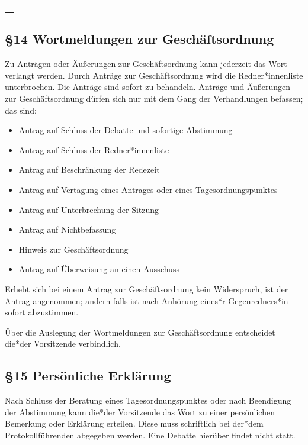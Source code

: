 \documentclass[12pt]{report}
\begin{document}
\begin{flushleft}
\begin{table}[H]
 \begin{tabular}{|l|}
  \hline
  \rowcolor[HTML]{9AFF99} 
  \rule[-1ex]{0pt}{4ex}
  \begin{minipage}[t]{\textwidth}
   \textbf{Ende\\}  
    \end{minipage}
  \\ \hline
 \end{tabular}
\end{table}

\subsection*{§14 Wortmeldungen zur Geschäftsordnung}
Zu Anträgen oder Äußerungen zur Geschäftsordnung kann jederzeit das Wort verlangt werden.
Durch Anträge zur Geschäftsordnung wird die {\color{red}Redner*innenliste} unterbrochen. Die Anträge sind sofort zu
behandeln. Anträge und Äußerungen zur Geschäftsordnung dürfen sich nur mit dem Gang der Verhandlungen
befassen; das sind:

\begin{itemize}
  \item Antrag auf Schluss der Debatte und sofortige Abstimmung
  \item Antrag auf Schluss der {\color{red}Redner*innenliste}
  \item Antrag auf Beschränkung der Redezeit
  \item Antrag auf Vertagung eines Antrages oder eines Tagesordnungspunktes
  \item Antrag auf Unterbrechung der Sitzung
  \item Antrag auf Nichtbefassung
  \item Hinweis zur Geschäftsordnung
  \item Antrag auf Überweisung an einen Ausschuss
\end{itemize}

Erhebt sich bei einem Antrag zur Geschäftsordnung kein Widerspruch, ist der Antrag angenommen; andern
falls ist nach Anhörung {\color{red}eines*r Gegenredners*in} sofort abzustimmen.

Über die Auslegung der Wortmeldungen zur Geschäftsordnung entscheidet {\color{red}die*der} Vorsitzende verbindlich.


\subsection*{§15 Persönliche Erklärung}
Nach Schluss der Beratung eines Tagesordnungspunktes oder nach Beendigung der Abstimmung kann {\color{red}die*der}
Vorsitzende das Wort zu einer persönlichen Bemerkung oder Erklärung erteilen. Diese muss schriftlich bei
{\color{red}der*dem} Protokollführenden abgegeben werden. Eine Debatte hierüber findet nicht statt.

\end{flushleft}
\end{document}

